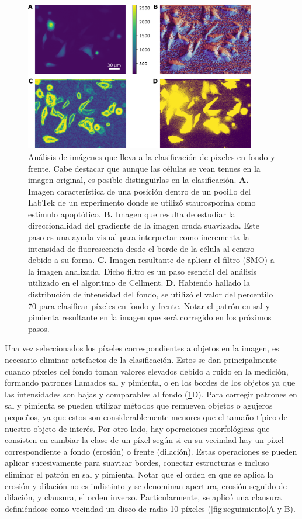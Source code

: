 \begin{figure}[htb]
    \centering
    \includegraphics[width=0.9\textwidth]{img/cap_2/clasificacion.pdf}
    \caption{\footnotesize{Análisis de imágenes que lleva a la clasificación de píxeles en fondo y frente. Cabe destacar que aunque las células se vean tenues en la imagen original, es posible distinguirlas en la clasificación. \textbf{A.} Imagen característica de una posición dentro de un pocillo del LabTek de un experimento donde se utilizó staurosporina como estímulo apoptótico. \textbf{B.} Imagen que resulta de estudiar la direccionalidad del gradiente de la imagen cruda suavizada. Este paso es una ayuda visual para interpretar como incrementa la intensidad de fluorescencia desde el borde de la célula al centro debido a su forma. \textbf{C.} Imagen resultante de aplicar el filtro  (SMO) a la imagen analizada. Dicho filtro es un paso esencial del análisis utilizado en el algoritmo de Cellment. \textbf{D.} Habiendo hallado la distribución de intensidad del fondo, se utilizó el valor del percentilo 70 para clasificar píxeles en fondo y frente. Notar el patrón en sal y pimienta resultante en la imagen que será corregido en los próximos pasos.}}
    \label{fig:clasificacion}
\end{figure}

Una vez seleccionados los píxeles correspondientes a objetos en la imagen, es necesario eliminar artefactos de la clasificación. Estos se dan principalmente cuando píxeles del fondo toman valores elevados debido a ruido en la medición, formando patrones llamados sal y pimienta, o en los bordes de los objetos ya que las intensidades son bajas y comparables al fondo (\cref{fig:clasificacion}D). Para corregir patrones en sal y pimienta se pueden utilizar métodos que remueven objetos o agujeros pequeños, ya que estos son considerablemente menores que el tamaño típico de nuestro objeto de interés. Por otro lado, hay operaciones morfológicas que consisten en cambiar la clase de un píxel según si en su vecindad hay un píxel correspondiente a fondo (erosión) o frente (dilación). Estas operaciones se pueden aplicar sucesivamente para suavizar bordes, conectar estructuras e incluso eliminar el patrón en sal y pimienta. Notar que el orden en que se aplica la erosión y dilación no es indistinto y se denominan apertura, erosión seguido de dilación, y clausura, el orden inverso. Particularmente, se aplicó una clausura definiéndose como vecindad un disco de radio 10 píxeles (\cref{fig:seguimiento}A y B).


